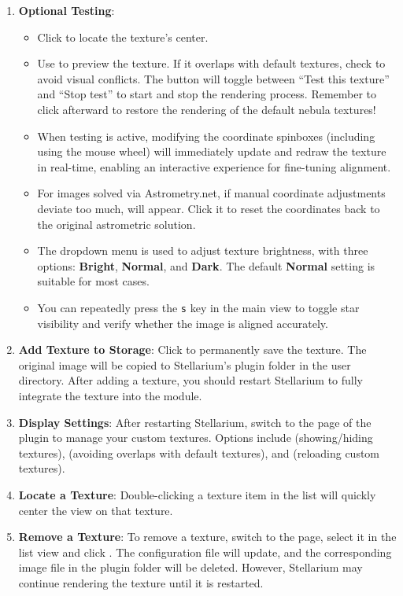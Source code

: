 \begin{enumerate}
    \item \textbf{Optional Testing}:
    \begin{itemize}
        \item Click  to locate the texture's center.
        \item Use  to preview the texture. If it overlaps with default textures, check  to avoid visual conflicts. 
		The  button will toggle between “Test this texture” and “Stop test” to start and stop the rendering process. 
		Remember to click  afterward to restore the rendering of the default nebula textures! 
        \item When testing is active, modifying the coordinate spinboxes (including using the mouse wheel) will immediately update and redraw the texture in real-time, enabling an interactive experience for fine-tuning alignment.
        \item For images solved via Astrometry.net, if manual coordinate adjustments deviate too much,  will appear. Click it to reset the coordinates back to the original astrometric solution.
        \item The dropdown menu is used to adjust texture brightness, with three options: \textbf{Bright}, \textbf{Normal}, and \textbf{Dark}. 
		The default \textbf{Normal} setting is suitable for most cases.
        \item You can repeatedly press the \texttt{s} key in the main view to toggle star visibility and verify whether the image is aligned accurately.
    \end{itemize}

    \item \textbf{Add Texture to Storage}: Click  to permanently save 
	the texture. The original image will be copied to Stellarium's plugin folder in the user 
	directory. After adding a texture, you should restart Stellarium to fully integrate the texture into the module.

    \item \textbf{Display Settings}: After restarting Stellarium, switch to the  page of the 
	plugin to manage your custom textures. Options include  (showing/hiding textures),  (avoiding 
	overlaps with default textures), and  (reloading custom textures).

    \item \textbf{Locate a Texture}: Double-clicking a texture item in the list will quickly center the view on that texture.

    \item \textbf{Remove a Texture}: To remove a texture, switch to the  page, select it in 
	the list view and click . The configuration file 
	will update, and the corresponding image file in the plugin folder will be deleted. However, 
	Stellarium may continue rendering the texture until it is restarted.
\end{enumerate}

